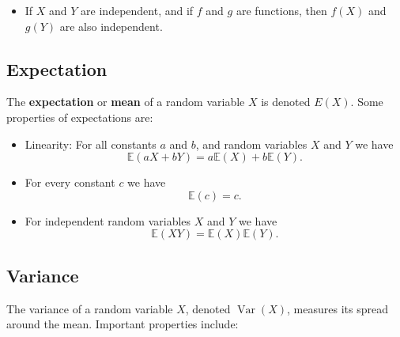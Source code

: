 \documentclass[
  a4paper,
]{article}
\providecommand{\tightlist}{%
  \setlength{\itemsep}{0pt}\setlength{\parskip}{0pt}}
\theoremstyle{definition}
\theoremstyle{definition}
\theoremstyle{definition}
\theoremstyle{definition}
\theoremstyle{remark}
\begin{document}
\begin{itemize}
\tightlist
\item
  If \(X\) and \(Y\) are independent, and if \(f\) and \(g\) are functions,
  then \(f(X)\) and \(g(Y)\) are also independent.
\end{itemize}

\subsection{Expectation}\label{expectation-1}

The \textbf{expectation} or \textbf{mean} of a random variable \(X\) is denoted \(E(X)\).
Some properties of expectations are:

\begin{itemize}
\item
  Linearity: For all constants \(a\) and \(b\), and random variables \(X\) and \(Y\)
  we have
  \begin{equation*}
    \mathbb{E}(aX + bY) = a\mathbb{E}(X) + b\mathbb{E}(Y).
  \end{equation*}
\item
  For every constant \(c\) we have
  \begin{equation*}
    \mathbb{E}(c) = c.
  \end{equation*}
\item
  For independent random variables \(X\) and \(Y\) we have
  \begin{equation*}
    \mathbb{E}(XY) = \mathbb{E}(X)\mathbb{E}(Y).
  \end{equation*}
\end{itemize}

\subsection{Variance}\label{variance-1}

The variance of a random variable \(X\), denoted \(\mathop{\mathrm{Var}}(X)\), measures its spread
around the mean. Important properties include:
\end{document}

